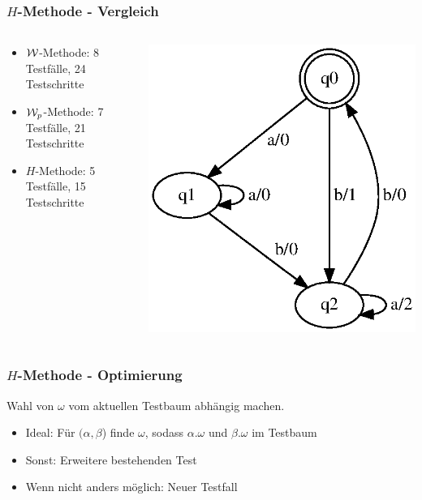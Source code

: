 \begin{frame}
\frametitle{$H$-Methode - Vergleich}
\begin{columns}[T] %

\begin{column}{.7\textwidth}
\begin{itemize}[<+->]
    \item $\mathcal{W}$-Methode: 8 Testfälle, 24 Testschritte
    \item $\mathcal{W}_p$-Methode: 7 Testfälle, 21 Testschritte
    \item $H$-Methode: 5 Testfälle, 15 Testschritte
\end{itemize}
\end{column}%

\begin{column}{.50\textwidth}
\centering
\includegraphics[width=\textwidth]{images/fsm-example01_orig}%
\end{column}%

\end{columns}
\end{frame}

\begin{frame}
\frametitle{$H$-Methode - Optimierung}
Wahl von $\omega$ vom aktuellen Testbaum abhängig machen.

\begin{itemize}
      \item<2-> Ideal: Für $(\alpha, \beta$) finde $\omega$, sodass $\alpha.\omega$ und $\beta.\omega$ im Testbaum
      \item<3-> Sonst: Erweitere bestehenden Test
      \item<4-> Wenn nicht anders möglich: Neuer Testfall 
    \end{itemize}
\end{frame}

